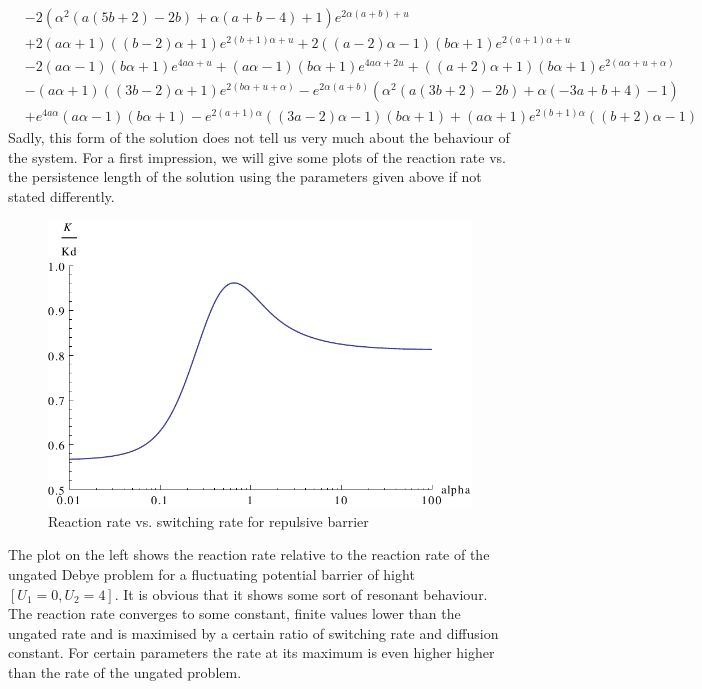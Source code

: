 \begin{align*}
    &-2 \left(\alpha^2 (a (5 b+2)-2 b)+\alpha (a+b-4)+1\right) e^{2 \alpha (a+b)+u} \\
    &+2 (a \alpha+1) ((b-2) \alpha+1) e^{2 (b+1) \alpha+u}+2 ((a-2) \alpha-1) (b \alpha+1) e^{2 (a+1) \alpha+u} \\
    &-2 (a \alpha-1) (b \alpha+1) e^{4 a \alpha+u}+(a \alpha-1) (b \alpha+1) e^{4 a \alpha+2 u}+((a+2) \alpha+1) (b \alpha+1) e^{2 (a \alpha+u+\alpha)} \\
    &-(a \alpha+1) ((3 b-2) \alpha+1) e^{2 (b \alpha+u+\alpha)}-e^{2 \alpha (a+b)} \left(\alpha^2 (a (3 b+2)-2 b)+\alpha (-3 a+b+4)-1\right) \\
    &+e^{4 a \alpha} (a \alpha-1) (b \alpha+1)-e^{2 (a+1) \alpha} ((3 a-2) \alpha-1) (b \alpha+1)+(a \alpha+1) e^{2 (b+1) \alpha} ((b+2) \alpha-1)
\end{align*}
Sadly, this form of the solution does not tell us very much about the behaviour of the system. For a first impression, we will give some plots of the reaction rate vs. the persistence length of the solution using the parameters given above if not stated differently.\\
\begin{minipage}[t]{0.7 \textwidth}
    \begin{figure}[H]
        \includegraphics[width = 1 \textwidth]{plots/rate1.pdf}
    \caption{Reaction rate vs. switching rate for repulsive barrier}
    \end{figure}
\end{minipage}\begin{minipage}[t]{0.3 \textwidth}
The plot on the left shows the reaction rate relative to the reaction rate of the ungated Debye problem for a fluctuating potential barrier of hight $[U_1 = 0, U_2 = 4]$. It is obvious that it shows some sort of resonant behaviour. The reaction rate converges to some constant, finite values lower than the ungated rate and is maximised by a certain ratio of switching rate and diffusion constant. For certain parameters the rate at its maximum is even higher higher than the rate of the ungated problem.
\end{minipage}
